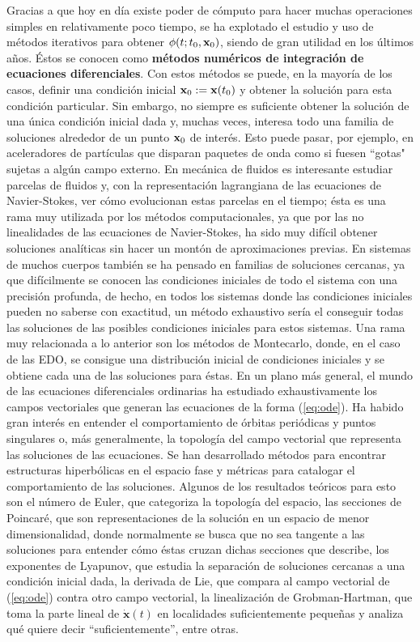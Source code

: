 Gracias a que hoy en día existe poder de cómputo para hacer muchas operaciones simples en relativamente poco tiempo, se ha explotado el estudio y uso de métodos iterativos para obtener $\phi(t;t_0,\mathbf{x}_0)$, siendo de gran utilidad en los últimos años. Éstos se conocen como \textbf{métodos numéricos de integración de ecuaciones diferenciales}. Con estos métodos se puede, en la mayoría de los casos, definir una condición inicial $\mathbf{x}_0 := \mathbf{x}(t_0)$ y obtener la solución para esta condición particular. Sin embargo, no siempre es suficiente obtener la solución de una única condición inicial dada y, muchas veces, interesa todo una familia de soluciones alrededor de un punto $\mathbf{x}_0$ de interés. Esto puede pasar, por ejemplo, en aceleradores de partículas que disparan paquetes de onda como si fuesen ``gotas" sujetas a algún campo externo. En mecánica de fluidos es interesante estudiar parcelas de fluidos y, con la representación lagrangiana de las ecuaciones de Navier-Stokes, ver cómo evolucionan estas parcelas en el tiempo; ésta es una rama muy utilizada por los métodos computacionales, ya que por las no linealidades de las ecuaciones de Navier-Stokes, ha sido muy difícil obtener soluciones analíticas sin hacer un montón de aproximaciones previas. En sistemas de muchos cuerpos también se ha pensado en familias de soluciones cercanas, ya que difícilmente se conocen las condiciones iniciales de todo el sistema con una precisión profunda, de hecho, en todos los sistemas donde las condiciones iniciales pueden no saberse con exactitud, un método exhaustivo sería el conseguir todas las soluciones de las posibles condiciones iniciales para estos sistemas. Una rama muy relacionada a lo anterior son los métodos de Montecarlo, donde, en el caso de las EDO, se consigue una distribución inicial de condiciones iniciales y se obtiene cada una de las soluciones para éstas. 
En un plano más general, el mundo de las ecuaciones diferenciales ordinarias ha estudiado exhaustivamente los campos vectoriales que generan las ecuaciones de la forma (\ref{eq:ode}). Ha habido gran interés en entender el comportamiento de órbitas periódicas y puntos singulares o, más generalmente, la topología del campo vectorial que representa las soluciones de las ecuaciones. Se han desarrollado métodos para encontrar estructuras hiperbólicas en el espacio fase y métricas para catalogar el comportamiento de las soluciones. Algunos de los resultados teóricos para esto son el número de Euler, que categoriza la topología del espacio, las secciones de Poincaré, que son representaciones de la solución en un espacio de menor dimensionalidad, donde normalmente se busca que no sea tangente a las soluciones para entender cómo éstas cruzan dichas secciones que describe, los exponentes de Lyapunov, que estudia la separación de soluciones cercanas a una condición inicial dada, la derivada de Lie, que compara al campo vectorial de (\ref{eq:ode}) contra otro campo vectorial, la linealización de Grobman-Hartman, que toma la parte lineal de $\dot{\mathbf{x}}(t)$ en localidades suficientemente pequeñas y analiza qué quiere decir ``suficientemente'', entre otras. 

